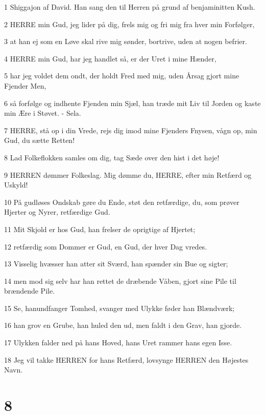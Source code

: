 \par 1 Shiggajon af David. Han sang den til Herren på grund af benjaminitten Kush.
\par 2 HERRE min Gud, jeg lider på dig, frels mig og fri mig fra hver min Forfølger,
\par 3 at han ej som en Løve skal rive mig sønder, bortrive, uden at nogen befrier.
\par 4 HERRE min Gud, har jeg handlet så, er der Uret i mine Hænder,
\par 5 har jeg voldet dem ondt, der holdt Fred med mig, uden Årsag gjort mine Fjender Men,
\par 6 så forfølge og indhente Fjenden min Sjæl, han træde mit Liv til Jorden og kaste min Ære i Støvet. - Sela.
\par 7 HERRE, stå op i din Vrede, rejs dig imod mine Fjenders Fnysen, vågn op, min Gud, du sætte Retten!
\par 8 Lad Folkeflokken samles om dig, tag Sæde over den hist i det høje!
\par 9 HERREN dømmer Folkeslag. Mig dømme du, HERRE, efter min Retfærd og Uskyld!
\par 10 På gudløses Ondskab gøre du Ende, støt den retfærdige, du, som prøver Hjerter og Nyrer, retfærdige Gud.
\par 11 Mit Skjold er hos Gud, han frelser de oprigtige af Hjertet;
\par 12 retfærdig som Dommer er Gud, en Gud, der hver Dag vredes.
\par 13 Visselig hvæsser han atter sit Sværd, han spænder sin Bue og sigter;
\par 14 men mod sig selv har han rettet de dræbende Våben, gjort sine Pile til brændende Pile.
\par 15 Se, hanundfanger Tomhed, svanger med Ulykke føder han Blændværk;
\par 16 han grov en Grube, han huled den ud, men faldt i den Grav, han gjorde.
\par 17 Ulykken falder ned på hans Hoved, hans Uret rammer hans egen Isse.
\par 18 Jeg vil takke HERREN for hans Retfærd, lovsynge HERREN den Højestes Navn.

\chapter{8}

